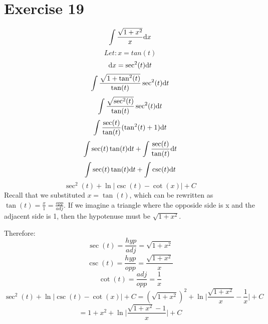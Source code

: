 \documentclass[letterpaper, 12pt]{math}
\begin{document}
\section*{Exercise 19}
\[ \int{\frac{\sqrt{1+x^{2}}}{x}\mathrm{d}{x}} \]
\[ Let: x = tan(t) \]
\[ \mathrm{d}{x} = \sec^{2}(t)\mathrm{d}{t} \]
\[ \int{\frac{\sqrt{1+\tan^{2}(t)}}{\tan(t)}\sec^{2}(t)\mathrm{d}{t}} \]
\[ \int{\frac{\sqrt{\sec^{2}(t)}}{\tan(t)}\sec^{2}(t)\mathrm{d}{t}} \]
\[ \int{\frac{\sec(t)}{\tan(t)}(\tan^{2}(t)+1)\mathrm{d}{t}} \]
\[ \int{\sec(t)\tan(t)\mathrm{d}{t}}+\int{\frac{\sec(t)}{\tan(t)}\mathrm{d}{t}} \]
\[ \int{\sec(t)\tan(t)\mathrm{d}{t}}+\int{\csc(t)}\mathrm{d}{t} \]
\[ \sec^{2}(t)+\ln|\csc(t)-\cot(x)|+C \]
Recall that we substituted \( x=\tan(t) \), which can be rewritten as
\( \tan(t) = \frac{x}{1} = \frac{opp}{adj} \). If we imagine a triangle where
the opposide side is x and the adjacent side is 1, then the hypotenuse must be
\( \sqrt{1+x^{2}} \).
\begin{center}
\end{center}
Therefore:
\[ \sec(t) = \frac{hyp}{adj} = \sqrt{1+x^{2}} \]
\[ \csc(t) = \frac{hyp}{opp} = \frac{\sqrt{1+x^{2}}}{x} \]
\[ \cot(t) = \frac{adj}{opp} = \frac{1}{x} \]
\[ \sec^{2}(t)+\ln|\csc(t)-\cot(x)|+C = (\sqrt{1+x^{2}})^{2}+
   \ln\bigg|\frac{\sqrt{1+x^{2}}}{x}-\frac{1}{x}\bigg|+C \]
\[ = 1+x^{2}+\ln\bigg|\frac{\sqrt{1+x^{2}}-1}{x}\bigg|+C \]
\end{document}
